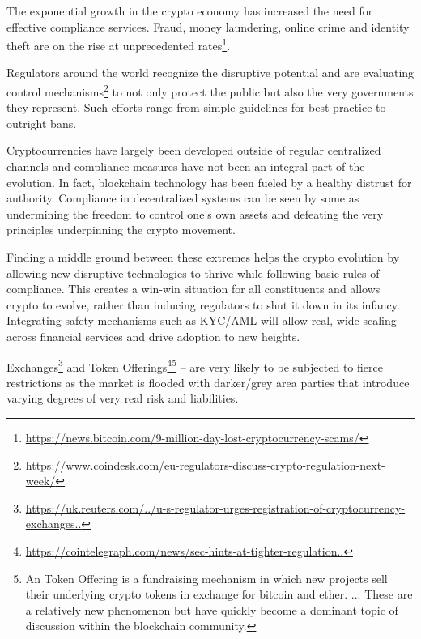 \documentclass[a4paper]{article}
\begin{document}
The exponential growth in the crypto economy has increased the need for effective compliance services. Fraud, money laundering, online crime and identity theft are on the rise at unprecedented rates\footnote{\url{https://news.bitcoin.com/9-million-day-lost-cryptocurrency-scams/}}. 

Regulators around the world recognize the disruptive potential and are evaluating control mechanisms\footnote{\url{https://www.coindesk.com/eu-regulators-discuss-crypto-regulation-next-week/}} to not only protect the public but also the very governments they represent. Such efforts range from simple guidelines for best practice to outright bans. 

Cryptocurrencies have largely been developed outside of regular centralized channels and compliance measures have not been an integral part of the evolution. In fact, blockchain technology has been fueled by a healthy distrust for authority. Compliance in decentralized systems can be seen by some as undermining the freedom to control one’s own assets and defeating the very principles underpinning the crypto movement. 

Finding a middle ground between these extremes helps the crypto evolution by allowing new disruptive technologies to thrive while following basic rules of compliance. This creates a win-win situation for all constituents and allows crypto to evolve, rather than inducing regulators to shut it down in its infancy. Integrating safety mechanisms such as KYC/AML will allow real, wide scaling across financial services and drive adoption to new heights. 

Exchanges\footnote{\href{https://uk.reuters.com/article/uk-usa-sec-crypto/u-s-regulator-urges-registration-of-cryptocurrency-exchanges-idUKKCN1GO2D0}{https://uk.reuters.com/../u-s-regulator-urges-registration-of-cryptocurrency-exchanges..}} and Token Offerings\footnote{\href{https://cointelegraph.com/news/sec-hints-at-tighter-regulation-for-icos-smart-policies-for-true-cryptocurrencies}{https://cointelegraph.com/news/sec-hints-at-tighter-regulation..}}\footnote{An Token Offering is a fundraising mechanism in which new projects sell their underlying crypto tokens in exchange for bitcoin and ether. ... These are a relatively new phenomenon but have quickly become a dominant topic of discussion within the blockchain community.} – are very likely to be subjected to fierce restrictions as the market is flooded with darker/grey area parties that introduce varying degrees of very real risk and liabilities. 
\end{document}
